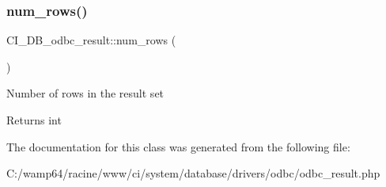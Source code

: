 \subsubsection{\texorpdfstring{num\+\_\+rows()}{num\_rows()}}
{\footnotesize\ttfamily C\+I\+\_\+\+D\+B\+\_\+odbc\+\_\+result\+::num\+\_\+rows (\begin{DoxyParamCaption}{ }\end{DoxyParamCaption})}

Number of rows in the result set

\begin{DoxyReturn}{Returns}
int 
\end{DoxyReturn}


The documentation for this class was generated from the following file\+:\begin{DoxyCompactItemize}
\item 
C\+:/wamp64/racine/www/ci/system/database/drivers/odbc/odbc\+\_\+result.\+php\end{DoxyCompactItemize}
